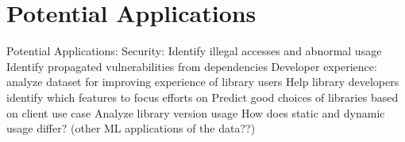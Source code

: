 \section{Potential Applications}
Potential Applications:
Security: 
Identify illegal accesses and abnormal usage
Identify propagated vulnerabilities from dependencies
Developer experience: analyze dataset for improving experience of library users
Help library developers identify which features to focus efforts on
Predict good choices of libraries based on client use case
Analyze library version usage
How does static and dynamic usage differ?
(other ML applications of the data??)
